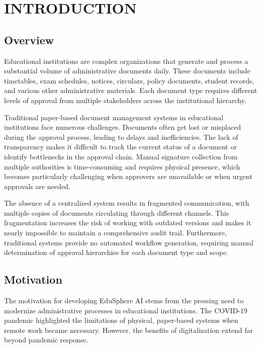\chapter{INTRODUCTION}

\section{Overview}

Educational institutions are complex organizations that generate and process a substantial volume of administrative documents daily. These documents include timetables, exam schedules, notices, circulars, policy documents, student records, and various other administrative materials. Each document type requires different levels of approval from multiple stakeholders across the institutional hierarchy.

Traditional paper-based document management systems in educational institutions face numerous challenges. Documents often get lost or misplaced during the approval process, leading to delays and inefficiencies. The lack of transparency makes it difficult to track the current status of a document or identify bottlenecks in the approval chain. Manual signature collection from multiple authorities is time-consuming and requires physical presence, which becomes particularly challenging when approvers are unavailable or when urgent approvals are needed.

The absence of a centralized system results in fragmented communication, with multiple copies of documents circulating through different channels. This fragmentation increases the risk of working with outdated versions and makes it nearly impossible to maintain a comprehensive audit trail. Furthermore, traditional systems provide no automated workflow generation, requiring manual determination of approval hierarchies for each document type and scope.

\section{Motivation}

The motivation for developing EduSphere AI stems from the pressing need to modernize administrative processes in educational institutions. The COVID-19 pandemic highlighted the limitations of physical, paper-based systems when remote work became necessary. However, the benefits of digitalization extend far beyond pandemic response.

